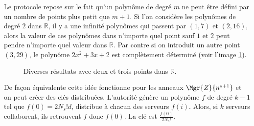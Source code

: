 	Le protocole repose sur le fait qu'un polynôme de degré $m$ ne peut être défini par un nombre de points plus petit que $m+1$. 
	Si l'on considère les polynômes de degré $2$ dans $\mathbb{R}$, il y a une infinité polynômes qui passent par $(1,7)$ et $(2,16)$, alors
	la valeur de ces polynômes dans n'importe quel point sauf $1$ et $2$ peut pendre n'importe quel valeur dans $\mathbb{R}$. Par contre
	si on introduit un autre point $(3,29)$, le polynôme $2x^2+3x+2$ est complètement déterminé (voir l'image \ref{graph:polyboth}).

	\begin{figure}[htl]
		\centering%
		\caption{Diverses résultats avec deux et trois points dans $\mathbb{R}$.}
		\label{graph:polyboth}
	\end{figure}

	De façon équivalente cette idée fonctionne pour les anneaux $\Mgr{Z}{n^{s+1}}$ et on peut créer des clés distribuées.
	L'autorité génère un polynôme $f$ de degré $k-1$ tel que $f(0) = 2N_s!d$, distribue à chacun des serveurs $f(i)$. 
	Alors, si $k$ serveurs collaborent, ils retrouvent $f$ donc $f(0)$. La clé est $\frac{f(0)}{2N_s!}$. 

